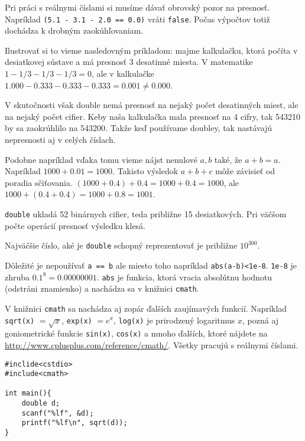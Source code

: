 Pri práci s reálnymi číslami si musíme dávať obrovský pozor na presnosť.
Napríklad \verb!(5.1 - 3.1 - 2.0 == 0.0)! vráti \verb!false!. Počas výpočtov totiž
dochádza k drobným zaokúhľovaniam.

Ilustrovať si to vieme nasledovným príkladom: majme kalkulačku, ktorá počíta v
desiatkovej sústave a má presnosť 3 desatinné miesta.  V matematike $1 - 1/3 -
1/3 - 1/3 = 0$, ale v kalkulačke $1.000 - 0.333 - 0.333 - 0.333 = 0.001 \neq
0.000$. 

V skutočnosti však double nemá presnosť na nejaký počet desatinných miest, ale
na nejaký počet cifier. Keby naša kalkulačka mala presnosť na 4 cifry, tak
543210 by sa zaokrúhlilo na 543200. Takže keď používame doubley, tak nastávajú
nepresnosti aj v celých číslach.

Podobne napríklad vďaka tomu vieme nájst nenulové $a,b$ také, že $a + b = a$.
Napríklad $1000 + 0.01 = 1000$. Takisto výsledok $a + b + c$ môže závisieť od
poradia sčiťovania. $(1000 + 0.4) + 0.4 = 1000 + 0.4 = 1000$, ale $1000 + (0.4
+ 0.4) = 1000 + 0.8 = 1001$.

\medskip

\verb!double! ukladá 52 binárnych cifier, teda približne 15 desiatkových.  Pri
väčšom počte operácií presnosť výsledku klesá.

Najväčšie číslo, aké je \verb!double! schopný reprezentovať je približne
$10^{300}$.

\medskip

Dôležité je nepoužívať \verb!a == b! ale miesto toho napríklad
\verb!abs(a-b)<1e-8!.  \verb!1e-8! je zhruba $0.1^8 = 0.00000001$. \verb!abs!
je funkcia, ktorá vracia absolútnu hodnotu (odstráni znamienko) a nachádza sa v
knižnici \verb!cmath!.


V knižnici \verb!cmath! sa nachádza aj zopár ďalších zaujímavých funkcií. 
Napríklad \verb!sqrt(x)! $= \sqrt{x}$, \verb!exp(x)! $= e^x$, \verb!log(x)! je prirodzený
logaritmus $x$, pozná aj goniometrické funkcie \verb!sin(x)!, \verb!cos(x)! a mnoho ďalších,
ktoré nájdete na \url{http://www.cplusplus.com/reference/cmath/}. 
Všetky pracujú s reálnymi číslami.

\begin{lstlisting}
#inclide<cstdio>
#include<cmath>

int main(){
    double d;
    scanf("%lf", &d);
    printf("%lf\n", sqrt(d));
}
\end{lstlisting}










